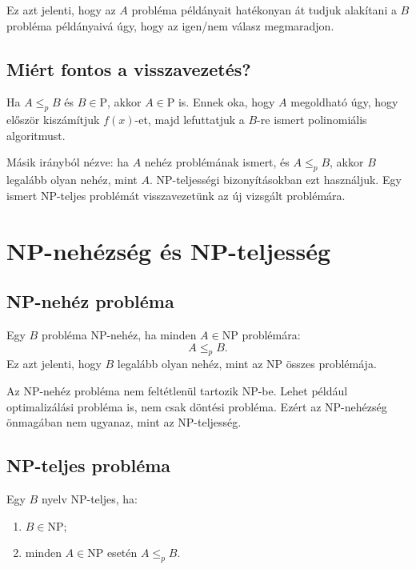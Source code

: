 Ez azt jelenti, hogy az $A$ probléma példányait hatékonyan át tudjuk alakítani a $B$ probléma példányaivá úgy, hogy az igen/nem válasz megmaradjon.


\subsection{Miért fontos a visszavezetés?}

Ha $A\leq_p B$ és $B\in\mathrm{P}$, akkor $A\in\mathrm{P}$ is. Ennek oka, hogy $A$ megoldható úgy, hogy először kiszámítjuk $f(x)$-et, majd lefuttatjuk a $B$-re ismert polinomiális algoritmust.

Másik irányból nézve: ha $A$ nehéz problémának ismert, és $A\leq_p B$, akkor $B$ legalább olyan nehéz, mint $A$. NP-teljességi bizonyításokban ezt használjuk. Egy ismert NP-teljes problémát visszavezetünk az új vizsgált problémára.

\begin{center}

\end{center}

\section{NP-nehézség és NP-teljesség}

\subsection{NP-nehéz probléma}

Egy $B$ probléma NP-nehéz, ha minden $A\in\mathrm{NP}$ problémára:
\[
  A\leq_p B.
\]
Ez azt jelenti, hogy $B$ legalább olyan nehéz, mint az $\mathrm{NP}$ összes problémája.

Az NP-nehéz probléma nem feltétlenül tartozik $\mathrm{NP}$-be. Lehet például optimalizálási probléma is, nem csak döntési probléma. Ezért az NP-nehézség önmagában nem ugyanaz, mint az NP-teljesség.

\subsection{NP-teljes probléma}

Egy $B$ nyelv NP-teljes, ha:

\begin{enumerate}
  \item $B\in\mathrm{NP}$;
  \item minden $A\in\mathrm{NP}$ esetén $A\leq_p B$.
\end{enumerate}

